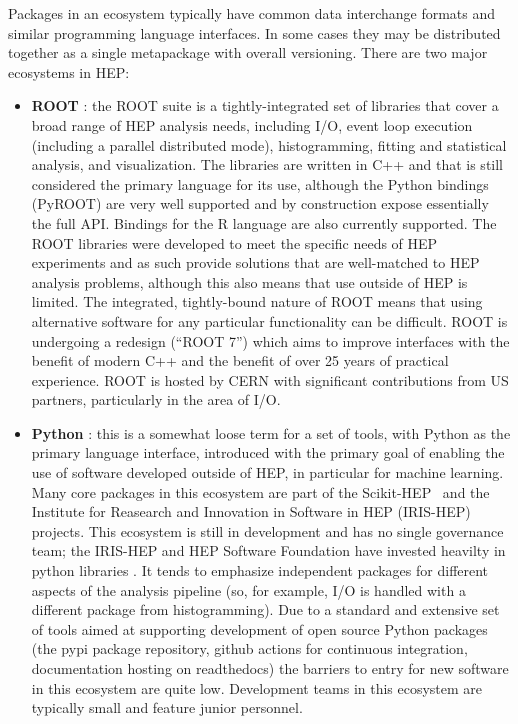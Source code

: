 Packages in an ecosystem typically have common data interchange formats and similar programming language interfaces. In some cases they may be distributed together as a single metapackage with overall versioning. There are two major ecosystems in HEP:
\begin{itemize}
    \item \textbf{ROOT} \cite{Brun:1997pa}: the ROOT suite is a tightly-integrated set of libraries that cover a broad range of HEP analysis needs, including I/O, event loop execution (including a parallel distributed mode), histogramming, fitting and statistical analysis, and visualization. The libraries are written in C++ and that is still considered the primary language for its use, although the Python bindings (PyROOT) are very well supported and by construction expose essentially the full API.  Bindings for the R language are also currently supported. The ROOT libraries were developed to meet the specific needs of HEP experiments and as such provide solutions that are well-matched to HEP analysis problems, although this also means that use outside of HEP is limited. The integrated, tightly-bound nature of ROOT means that using alternative software for any particular functionality can be difficult. ROOT is undergoing a redesign \cite{Naumann:2022pub} (``ROOT 7'') which aims to improve interfaces with the benefit of modern C++ and the benefit of over 25 years of practical experience. ROOT is hosted by CERN with significant contributions from US partners, particularly in the area of I/O.
    \item \textbf{Python} \cite{van1995python,10.5555/1593511}: this is a somewhat loose term for a set of tools, with Python as the primary language interface, introduced with the primary goal of enabling the use of software developed outside of HEP, in particular for machine learning. Many core packages in this ecosystem are part of the Scikit-HEP~\cite{Rodrigues:2020syo} and the Institute for Reasearch and Innovation in Software in HEP (IRIS-HEP)~\cite{IRISHEPWEB} projects. This ecosystem is still in development and has no single governance team; the IRIS-HEP and HEP Software Foundation have invested heavilty in python libraries \cite{Pivarski:2022ycs,}. It tends to emphasize independent packages for different aspects of the analysis pipeline (so, for example, I/O is handled with a different package from histogramming). Due to a standard and extensive set of tools aimed at supporting development of open source Python packages (the pypi package repository, github actions for continuous integration, documentation hosting on readthedocs) the barriers to entry for new software in this ecosystem are quite low. Development teams in this ecosystem are typically small and feature junior personnel.
\end{itemize}

